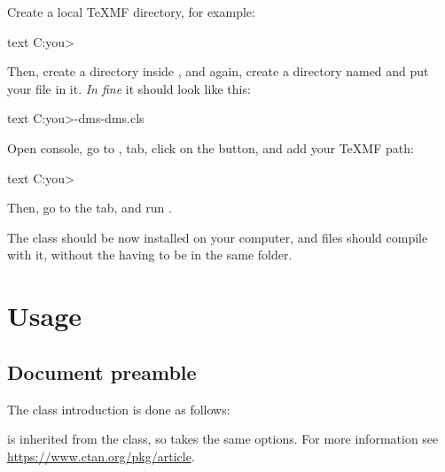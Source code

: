 \documentclass[a4paper, 11pt]{old-dms}
\begin{document}
\begin{ul}

\item{
Create a local \TeX MF directory, for example:
\begin{codeboxnonos}{text}
C:\Users\<you>\localtexmf\
\end{codeboxnonos}
}

\item{
Then, create a  directory inside , and again, create a directory named  and put your  file in it. \textit{In fine} it should look like this: 
\begin{codeboxnonos}{text}
C:\Users\<you>\localtexmf\tex\latex\old-dms\old-dms.cls
\end{codeboxnonos}
}

\item{
Open  console, go to ,  tab, click on the  button, and add your \TeX MF path:
\begin{codeboxnonos}{text}
C:\Users\<you>\localtexmf\
\end{codeboxnonos}
}

\item{
Then, go to the  tab, and run .
}

\end{ul}

The class should be now installed on your computer, and  files should compile with it, without the  having to be in the same folder.


\section{Usage}


\subsection{Document preamble}

The class introduction is done as follows:
\begin{codeboxnonos}{text}
\documentclass[<options>]{old-dms}
\end{codeboxnonos}

 is inherited from the  class, so  takes the same options. For more information see \url{https://www.ctan.org/pkg/article}.
\end{document}

